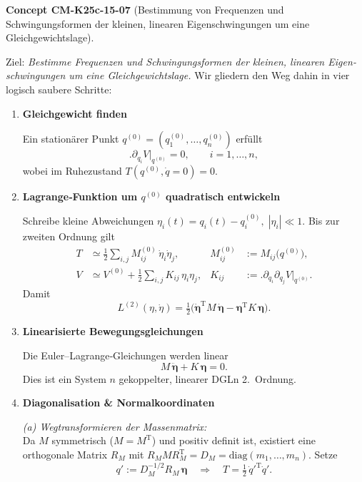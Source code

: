 \documentclass[10pt, letterpaper]{article}
\newcommand{\CustomHeading}[3]{%
  \par\medskip\noindent%
  \textbf{#1 #2} \textnormal{(#3)}.\enskip%
}
\newenvironment{CONC}[2]{\CustomHeading{Concept}{#1}{#2}}{}
\begin{document}
\begin{CONC}{CM-K25c-15-07}{Bestimmung von Frequenzen und Schwingungsformen der kleinen, linearen Eigen­schwingungen um eine Gleichgewichtslage}
Ziel: \emph{Bestimme Frequenzen und Schwingungsformen der
kleinen, linearen Eigen­schwingungen um
eine Gleichgewichtslage.}
Wir gliedern den Weg dahin in vier logisch saubere Schritte:
\begin{enumerate}[label=\textbf{\arabic*.},wide=0pt,leftmargin=*]
\item \textbf{Gleichgewicht finden}

Ein stationärer Punkt
\(q^{(0)}=(q^{(0)}_1,\dots,q^{(0)}_n)\) erfüllt
\[
  \bigl.\partial_{q_i}V\bigr|_{q^{(0)}} = 0,
  \qquad i=1,\dots,n ,
\]
wobei im Ruhezustand
\(T(q^{(0)},\dot q=0)=0\).
\item \textbf{Lagrange‐Funktion um $q^{(0)}$ quadratisch entwickeln}

Schreibe kleine Abweichungen
\(
  \eta_i(t) = q_i(t)-q_i^{(0)},\; |\eta_i|\ll 1 .
\)
Bis zur zweiten Ordnung gilt
\begin{align*}
  T &\simeq \tfrac12
        \sum_{i,j}M_{ij}^{(0)}\,\dot\eta_i\dot\eta_j, &
  M_{ij}^{(0)}&:=M_{ij}\bigl(q^{(0)}\bigr), \\[2pt]
  V &\simeq V^{(0)}+
        \tfrac12\sum_{i,j}K_{ij}\,\eta_i\eta_j, &
  K_{ij}&:=\bigl.\partial_{q_i}\partial_{q_j}V\bigr|_{q^{(0)}} .
\end{align*}
Damit
\[
  L^{(2)}(\eta,\dot\eta)=
  \tfrac12\!\bigl(\dot{\boldsymbol\eta}^{\mathrm T}
                 M\,\dot{\boldsymbol\eta}-
                 \boldsymbol\eta^{\mathrm T}
                 K\,\boldsymbol\eta\bigr).
\]

\item \textbf{Linearisierte Bewegungsgleichungen}

Die Euler–Lagrange‐Gleichungen werden linear
\[
  M\,\ddot{\boldsymbol\eta}+K\,\boldsymbol\eta=0.
\]
Dies ist ein System $n$ gekoppelter, linearer DGLn 2.~Ordnung.

\item \textbf{Diagonalisation \& Normalkoordinaten}

\emph{(a) Wegtransformieren der Massenmatrix:}\\
Da $M$ symmetrisch (\(M=M^{\mathrm T}\)) und positiv definit ist,
existiert eine orthogonale Matrix $R_M$ mit
\(R_M M R_M^{\mathrm T}=D_M=\mathrm{diag}(m_1,\dots,m_n)\).
Setze
\[
  q' := D_M^{-1/2} R_M\,\boldsymbol\eta
  \quad\Longrightarrow\quad
  T=\tfrac12\,\dot{q}'^{\mathrm T}\dot{q}' .
\]


\end{enumerate}
\end{CONC}
\end{document}
